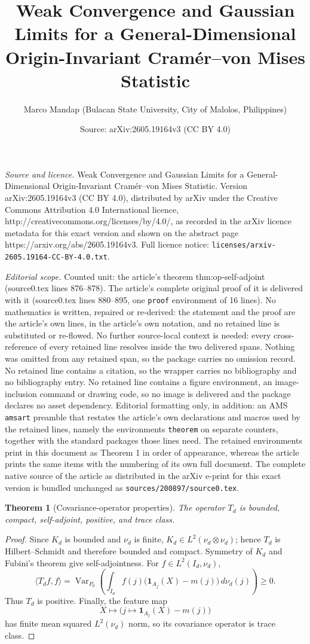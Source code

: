 \documentclass[10pt,a4paper]{amsart}
\title{Weak Convergence and Gaussian Limits for a General-Dimensional Origin-Invariant Cram\'er--von Mises Statistic}
\author{Marco Mandap (Bulacan State University, City of Malolos, Philippines)}
\date{Source: arXiv:2605.19164v3 (CC BY 4.0)}
\newtheorem{theorem}{Theorem}
\DeclareMathOperator{\Var}{Var}
\begin{document}
\maketitle

\noindent\emph{Source and licence.} Weak Convergence and Gaussian Limits for a General-Dimensional Origin-Invariant Cram\'er--von Mises Statistic. Version arXiv:2605.19164v3 (CC BY 4.0), distributed by arXiv under the Creative Commons Attribution 4.0 International licence, http://creativecommons.org/licenses/by/4.0/, as recorded in the arXiv licence metadata for this exact version and shown on the abstract page https://arxiv.org/abs/2605.19164v3. Full licence notice: \texttt{licenses/arxiv-2605.19164-CC-BY-4.0.txt}.\par\smallskip

\noindent\textit{Editorial scope.} Counted unit: the article's theorem thm:op-self-adjoint (source0.tex lines 876--878). The article's complete original proof of it is delivered with it (source0.tex lines 880--895, one \texttt{proof} environment of 16 lines). No mathematics is written, repaired or re-derived: the statement and the proof are the article's own lines, in the article's own notation, and no retained line is substituted or re-flowed.  No further source-local context is needed: every cross-reference of every retained line resolves inside the two delivered spans.  Nothing was omitted from any retained span, so the package carries no omission record.  No retained line contains a citation, so the wrapper carries no bibliography and no bibliography entry.  No retained line contains a figure environment, an image-inclusion command or drawing code, so no image is delivered and the package declares no asset dependency.  Editorial formatting only, in addition: an AMS \texttt{amsart} preamble that restates the article's own declarations and macros used by the retained lines, namely the environments \texttt{theorem} on separate counters, together with the standard packages those lines need.  The retained environments print in this document as Theorem 1 in order of appearance, whereas the article prints the same items with the numbering of its own full document.  The complete native source of the article as distributed in the arXiv e-print for this exact version is bundled unchanged as \texttt{sources/200897/source0.tex}.
\begin{theorem}[Covariance-operator properties]\label{thm:op-self-adjoint}
The operator $T_d$ is bounded, compact, self-adjoint, positive, and trace class.
\end{theorem}

\begin{proof}
Since $K_d$ is bounded and $\nu_d$ is finite, $K_d\in L^2(\nu_d\otimes\nu_d)$; hence $T_d$ is Hilbert--Schmidt and therefore bounded and compact. Symmetry of $K_d$ and Fubini's theorem give self-adjointness. For $f\in L^2(I_d,\nu_d)$,
\[
  \langle T_df,f\rangle
  =\Var_{P_0}\!\left(
    \int_{I_d}f(j)\bigl(\mathbf1_{A_j}(X)-m(j)\bigr)
    \,d\nu_d(j)
  \right)\ge0.
\]
Thus $T_d$ is positive. Finally, the feature map
\[
  X\longmapsto
  \bigl(j\mapsto\mathbf1_{A_j}(X)-m(j)\bigr)
\]
has finite mean squared $L^2(\nu_d)$ norm, so its covariance operator is trace class.
\end{proof}
\end{document}
